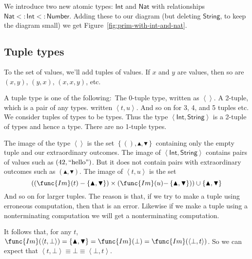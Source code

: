\documentclass[12pt]{article}
\begin{document}
We introduce two new atomic types: $\mathsf{Int}$ and $\mathsf{Nat}$ with
relationships $\mathsf{Nat}<:\mathsf{Int}<:\mathsf{Number}$. Adding these to
our diagram (but deleting $\mathsf{String}$, to keep the diagram small) we
get Figure~\ref{fig:prim-with-int-and-nat}.

\subsection{Tuple types}

To the set of values, we'll add tuples of values. If $x$ and $y$ are values,
then so are $\left( x,y\right) $, $\left( y,x\right) $, $\left( x,x,y\right) 
$, etc.

A tuple type is one of the following:\ The 0-tuple type, written as $%
\left\langle {}\right\rangle $. A 2-tuple, which is a pair of any types.
written $\left\langle t,u\right\rangle $. And so on for 3, 4, and 5 tuples
etc. We consider tuples of types to be types. Thus the type $\left\langle 
\mathsf{Int},\mathsf{String}\right\rangle $ is a 2-tuple of types and hence
a type. There are no 1-tuple types.

The image of the type $\left\langle {}\right\rangle $ is the set $\left\{
(),\blacktriangle ,\blacktriangledown \right\} $ containing only the empty
tuple and our extraordinary outcomes. The image of $\left\langle \mathsf{Int}%
,\mathsf{String}\right\rangle $ contains pairs of values such as $\left( 42,%
\text{\textquotedblleft hello\textquotedblright }\right) $. But it does not
contain pairs with extraordinary outcomes such as $\left( \blacktriangle
,\blacktriangledown \right) $. The image of $\left\langle t,u\right\rangle $
is the set 
\begin{equation*}
\left( \left( \func{Im}(t)-\left\{ \blacktriangle ,\blacktriangledown
\right\} \right) \times \left( \func{Im}(u\mathsf{)-}\left\{ \blacktriangle
,\blacktriangledown \right\} \right) \right) \cup \left\{ \blacktriangle
,\blacktriangledown \right\} 
\end{equation*}%
And so on for larger tuples. The reason is that, if we try to make a tuple
using erroneous computation, then that is an error. Likewise if we make a
tuple using a nonterminating computation we will get a nonterminating
computation.

It follows that, for any $t$, $\func{Im}(\left\langle t,\bot \right\rangle
)=\left\{ \blacktriangle ,\blacktriangledown \right\} =\func{Im}(\bot )=%
\func{Im}(\left\langle \bot ,t\right\rangle )$. So we can expect that $%
\left\langle t,\bot \right\rangle \equiv \bot \equiv \left\langle \bot
,t\right\rangle $.
\end{document}
